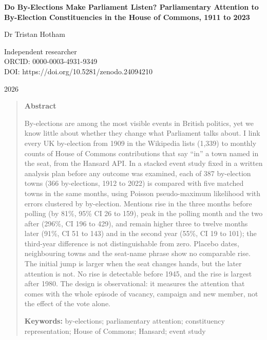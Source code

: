 \documentclass[11pt,a4paper]{article}
\begin{document}
\begin{center}
{\Large\bfseries Do By-Elections Make Parliament Listen? Parliamentary Attention to By-Election Constituencies in the House of Commons, 1911 to 2023\par}
\vspace{1.2em}
{\large Dr Tristan Hotham\par}
\vspace{0.3em}
{\small Independent researcher\\
ORCID: 0000-0003-4931-9349\\
DOI: https://doi.org/10.5281/zenodo.24094210\par}
\vspace{0.8em}
2026
\end{center}

\begin{quote}
\small
\begin{center}\textbf{Abstract}\end{center}
By-elections are among the most visible events in British politics, yet we know little about whether they change what Parliament talks about. I link every UK by-election from 1909 in the Wikipedia lists (1,339) to monthly counts of House of Commons contributions that say ``in'' a town named in the seat, from the Hansard API. In a stacked event study fixed in a written analysis plan before any outcome was examined, each of 387 by-election towns (366 by-elections, 1912 to 2022) is compared with five matched towns in the same months, using Poisson pseudo-maximum likelihood with errors clustered by by-election. Mentions rise in the three months before polling (by 81\%, 95\% CI 26 to 159), peak in the polling month and the two after (296\%, CI 196 to 429), and remain higher three to twelve months later (91\%, CI 51 to 143) and in the second year (55\%, CI 19 to 101); the third-year difference is not distinguishable from zero. Placebo dates, neighbouring towns and the seat-name phrase show no comparable rise. The initial jump is larger when the seat changes hands, but the later attention is not. No rise is detectable before 1945, and the rise is largest after 1980. The design is observational: it measures the attention that comes with the whole episode of vacancy, campaign and new member, not the effect of the vote alone.

\textbf{Keywords:} by-elections; parliamentary attention; constituency representation; House of Commons; Hansard; event study
\end{quote}
\end{document}

